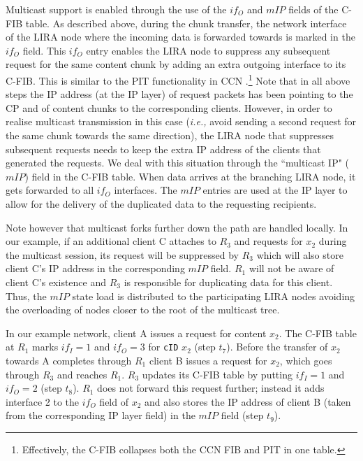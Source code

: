 \documentclass{sig-alternate}
\newcommand{\ie}{{\em i.e.,\/ }}
\begin{document}
Multicast support is enabled through the use of the $if_O$ and $mIP$ fields of the C-FIB table. As described above, during the chunk transfer, the network interface of the LIRA node where the incoming data is forwarded towards is marked in the $if_O$ field. This $if_O$ entry enables the LIRA node to suppress any subsequent request for the same content chunk by adding an extra outgoing interface to its C-FIB. This is similar to the PIT functionality in CCN \cite{ccn}.\footnote{Effectively, the C-FIB collapses both the CCN FIB and PIT in one table.}
Note that in all above steps the IP address (at the IP layer) of request packets has been pointing to the CP and of content chunks to the corresponding clients. However, in order to realise multicast transmission in this case (\ie avoid sending a second request for the same chunk towards the same direction), the LIRA node that suppresses subsequent requests needs to keep the extra IP address of the clients that generated the requests. We deal with this situation through the ``multicast IP" ($mIP$) field in the C-FIB table. When data arrives at the branching LIRA node, it gets forwarded to all $if_O$ interfaces. The $mIP$ entries are used at the IP layer to allow for the delivery of the duplicated data to the requesting recipients.

Note however that multicast forks further down the path are handled locally. In our example, if an additional client C attaches to $R_3$ and requests for $x_2$ during the multicast session, its request will be suppressed by $R_3$ which will also store client C's IP address in the corresponding $mIP$ field. $R_1$ will not be aware of client C's existence and $R_3$ is responsible for duplicating data for this client. Thus, the $mIP$ state load is distributed to the participating LIRA nodes avoiding the overloading of nodes closer to the root of the multicast tree.

In our example network, client A issues a request for content $x_2$. The C-FIB table at $R_1$ marks  $if_I = 1$ and $if_O = 3$ for \texttt{cID} $x_2$ (step $t_7$). Before the transfer of $x_2$ towards A completes through $R_1$ client B issues a request for $x_2$, which goes through $R_3$ and reaches $R_1$. $R_3$ updates its C-FIB table by putting $if_I = 1$ and $if_O = 2$ (step $t_8$). $R_1$ does not forward this request further; instead it adds interface 2 to the $if_O$ field of $x_2$ and also stores the IP address of client B (taken from the corresponding IP layer field) in the $mIP$ field (step $t_9$).
\end{document}
